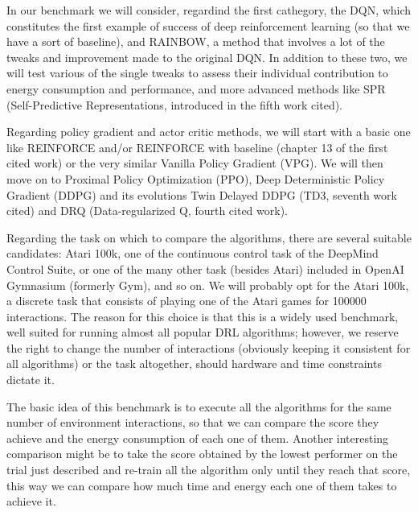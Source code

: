 \documentclass[a0paper,portrait]{baposter}
\begin{document}
\begin{poster}
{	In our benchmark we will consider, regardind the first cathegory, the DQN, which constitutes the first example of success of deep reinforcement learning (so that we have a sort of baseline), and RAINBOW, a method that involves a lot of the tweaks and improvement made to the original DQN. In addition to these two, we will test various of the single tweaks to assess their individual contribution to energy consumption and performance, and more advanced methods like SPR (Self-Predictive Representations, introduced in the fifth work cited).
	
	Regarding policy gradient and actor critic methods, we will start with a basic one like REINFORCE and/or REINFORCE with baseline (chapter 13 of the first cited work) or the very similar Vanilla Policy Gradient (VPG). We will then move on to Proximal Policy Optimization (PPO), Deep Deterministic Policy Gradient (DDPG)  and its evolutions Twin Delayed DDPG (TD3, seventh work cited) and DRQ (Data-regularized Q, fourth cited work).
	
	Regarding the task on which to compare the algorithms, there are several suitable candidates: Atari 100k, one of the continuous control task of the DeepMind Control Suite, or one of the many other task (besides Atari) included in OpenAI Gymnasium (formerly Gym), and so on. We will probably opt for the Atari 100k, a discrete task that consists of playing one of the Atari games for 100000 interactions. 
	The reason for this choice is that this is a widely used benchmark, well suited for running almost all popular DRL algorithms; however, we reserve the right to change the number of interactions (obviously keeping it consistent for all algorithms) or the task altogether, should hardware and time constraints dictate it.
	
	The basic idea of this benchmark is to execute all the algorithms for the same number of environment interactions, so that we can compare the score they achieve and the energy consumption of each one of them. Another interesting comparison might be to take the score obtained by the lowest performer on the trial just described and re-train all the algorithm only until they reach that score, this way we can compare how much time and energy each one of them takes to achieve it.

}

%
%
%
%


\end{poster}
\end{document}
